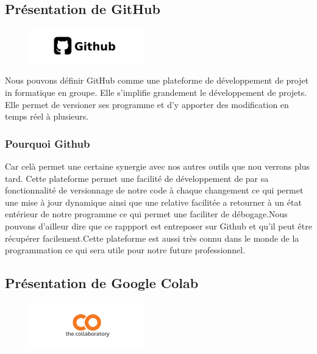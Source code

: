 \subsection{Présentation de GitHub}

\begin{figure}[h]
  \begin{center}
  \includegraphics[width=5cm]{./images/github.jpg}
  \end{center}
\end{figure}

Nous pouvons définir GitHub comme une plateforme de développement de projet in formatique en groupe. Elle s'implifie grandement le développement de projets. Elle permet de versioner ses programme et d'y apporter des modification en temps réel à plusieurs.

\subsubsection{Pourquoi Github}
Car celà permet une certaine synergie avec nos autres outils que nou verrons plus tard. Cette plateforme permet une facilité de développement de par sa fonctionnalité de versionnage de notre code à chaque changement ce qui permet une mise à jour dynamique ainsi que une relative facilitée a retourner à un état entérieur de notre programme ce qui permet une faciliter de débogage.Nous pouvons d'ailleur dire que ce rappport est entreposer sur Github et qu'il peut être récupérer facilement.Cette plateforme est aussi très connu dans le monde de la programmation ce qui sera utile pour notre future professionnel.

\subsection{Présentation de Google Colab}

\begin{figure}[h]
\begin{center}
\includegraphics[width=5cm]{./images/Colab_logo.png}
\end{center}
\end{figure}

